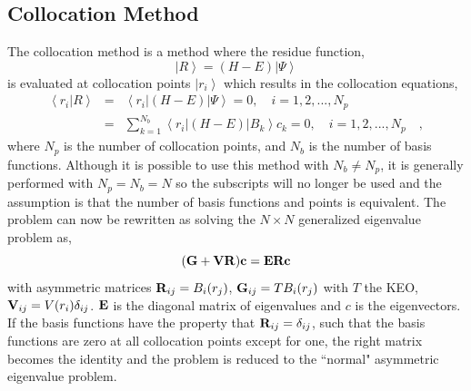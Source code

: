 \subsection{Collocation Method}
The collocation method\cite{Yang1988} is a method where the residue function,
\begin{equation}\label{eq.b24}
\left|R\right> = \left(H-E\right)\left|\Psi\right>
\end{equation}
is evaluated at collocation points $\left|r_i\right>$ which results in the collocation equations,
\begin{eqnarray}\label{eq.b25}
\left<r_i\right|\left.R\right>&=&\left<r_i\right|\left(H-E\right)\left|\Psi\right>=0,\quad i=1,2,...,N_p \nonumber \\
&=&\sum_{k=1}^{N_{b}}\left<r_i\right|\left(H-E\right) \left|B_k\right>c_k=0,\quad i=1,2,...,N_p\quad,
\end{eqnarray} 
where $N_p$ is the number of collocation points, and $N_b$ is the number of basis functions.  Although it is possible to use this method with $N_b\neq N_p$\cite{Manzhos2011}, it is generally performed with $N_p=N_b=N$ so the subscripts will no longer be used and the assumption is that the number of basis functions and points is equivalent.  The problem can now be rewritten as solving the $N\times N$ generalized eigenvalue problem as,
\begin{equation}\label{eq.b26}
({{\bf G}}+{{\bf VR}}){{\bf c}}={{\bf ERc}}
\end{equation}
with asymmetric matrices ${{\bf R}}_{ij}=B_i(r_j)$, ${{\bf G}}_{ij}=TB_i(r_j)$ with $T$ the KEO, ${{\bf V}}_{ij}=V(r_i)\delta_{ij}$. ${{\bf E}}$ is the diagonal matrix of eigenvalues and $c$ is the eigenvectors.  
If the basis functions have the property that ${{\bf R}}_{ij}=\delta_{ij}$, such that the basis functions are zero at all collocation points except for one, the right matrix becomes the identity and the problem is reduced to the ``normal" asymmetric eigenvalue problem.  

